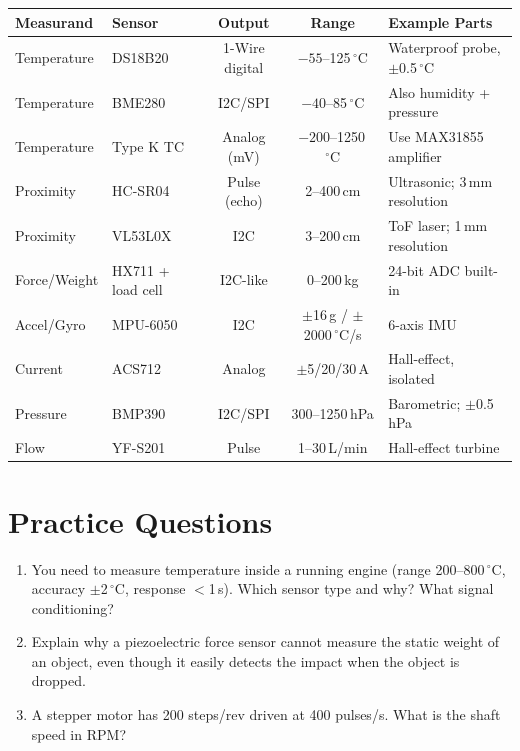 \documentclass[11pt,letterpaper,twoside,openany]{book}
\newcommand{\degC}{\ensuremath{{}^{\circ}\text{C}}}
\begin{document}
\begin{quickrefbox}
\begin{table}[H]\centering\small
\begin{tabularx}{\textwidth}{l l c c X}
\toprule
\textbf{Measurand} & \textbf{Sensor} & \textbf{Output} & \textbf{Range} & \textbf{Example Parts} \\
\midrule
Temperature & DS18B20 & 1-Wire digital & $-55$--125\,\degC{} & Waterproof probe, $\pm$0.5\,\degC{} \\
Temperature & BME280 & I2C/SPI & $-40$--85\,\degC{} & Also humidity + pressure \\
Temperature & Type K TC & Analog (mV) & $-200$--1250\,\degC{} & Use MAX31855 amplifier \\
Proximity & HC-SR04 & Pulse (echo) & 2--400\,cm & Ultrasonic; 3\,mm resolution \\
Proximity & VL53L0X & I2C & 3--200\,cm & ToF laser; 1\,mm resolution \\
Force/Weight & HX711 + load cell & I2C-like & 0--200\,kg & 24-bit ADC built-in \\
Accel/Gyro & MPU-6050 & I2C & $\pm$16\,g / $\pm$2000\,\degC{}/s & 6-axis IMU \\
Current & ACS712 & Analog & $\pm$5/20/30\,A & Hall-effect, isolated \\
Pressure & BMP390 & I2C/SPI & 300--1250\,hPa & Barometric; $\pm$0.5\,hPa \\
Flow & YF-S201 & Pulse & 1--30\,L/min & Hall-effect turbine \\
\bottomrule
\end{tabularx}
\end{table}
\end{quickrefbox}

\section{Practice Questions}
\begin{enumerate}[leftmargin=1.5em]
\item You need to measure temperature inside a running engine (range 200--800\,\degC{}, accuracy $\pm$2\,\degC{}, response $<$1\,s). Which sensor type and why? What signal conditioning?
\item Explain why a piezoelectric force sensor cannot measure the static weight of an object, even though it easily detects the impact when the object is dropped.
\item A stepper motor has 200 steps/rev driven at 400 pulses/s. What is the shaft speed in RPM?
\end{enumerate}
\end{document}
